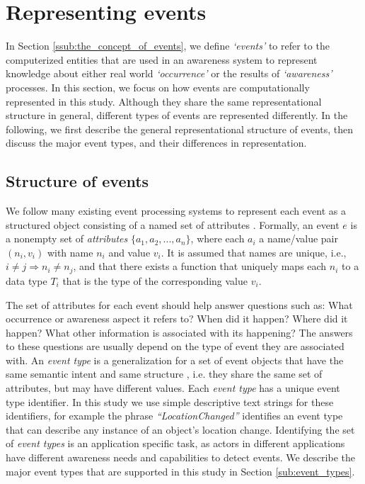 \section{Representing events} %
\label{sec:representing_events}
In Section \ref{ssub:the_concept_of_events}, we define \emph{`events'} to refer to the computerized entities that are used in an awareness system to represent knowledge about either real world \emph{`occurrence'} or the results of \emph{`awareness'} processes. In this section, we focus on how events are computationally represented in this study. Although they share the same representational structure in general, different types of events are represented differently. In the following, we first describe the general representational structure of events, then discuss the major event types, and their differences in representation.

\subsection{Structure of events} %
\label{sub:defining_events}
We follow many existing event processing systems to represent each event as a structured object consisting of a named set of attributes \cite{Mhl2010}. Formally, an event $e$ is a nonempty set of \emph{attributes} $\{a_1, a_2, ..., a_n\}$, where each $a_i$ a name/value pair $(n_i, v_i)$ with name $n_i$ and value $v_i$. It is assumed that names are unique, i.e., $i\ne j \Rightarrow n_i\ne n_j$, and that there exists a function that uniquely maps each $n_i$ to a data type $T_i$ that is the type of the corresponding value $v_i$.

The set of attributes for each event should help answer questions such as: What occurrence or awareness aspect it refers to? When did it happen? Where did it happen? What other information is associated with its happening? The answers to these questions are usually depend on the type of event they are associated with. An \emph{event type} is a generalization for a set of event objects that have the same semantic intent and same structure \cite{Etzion2010}, i.e. they share the same set of attributes, but may have different values. Each \emph{event type} has a unique event type identifier. In this study we use simple descriptive text strings for these identifiers, for example the phrase \emph{``LocationChanged''} identifies an event type that can describe any instance of an object's location change. Identifying the set of \emph{event types} is an application specific task, as actors in different applications have different awareness needs and capabilities to detect events. We describe the major event types that are supported in this study in Section \ref{sub:event_types}.


